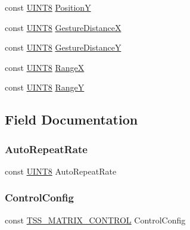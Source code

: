 \begin{DoxyCompactItemize}
\item 
const \hyperlink{_t_s_s___data_types_8h_ab27e9918b538ce9d8ca692479b375b6a}{U\+I\+N\+T8} \hyperlink{struct_t_s_s___c_s_matrix_aac24d6e91ed086564e138c28e7bdb734}{PositionY}
\item 
const \hyperlink{_t_s_s___data_types_8h_ab27e9918b538ce9d8ca692479b375b6a}{U\+I\+N\+T8} \hyperlink{struct_t_s_s___c_s_matrix_af3165ce319b813917cd3b590637f1119}{Gesture\+DistanceX}
\item 
const \hyperlink{_t_s_s___data_types_8h_ab27e9918b538ce9d8ca692479b375b6a}{U\+I\+N\+T8} \hyperlink{struct_t_s_s___c_s_matrix_a1ebd165f70fca973a3fb47a2968e6178}{Gesture\+DistanceY}
\item 
const \hyperlink{_t_s_s___data_types_8h_ab27e9918b538ce9d8ca692479b375b6a}{U\+I\+N\+T8} \hyperlink{struct_t_s_s___c_s_matrix_a93ec03e0fdd72db4648b7b80b6644626}{RangeX}
\item 
const \hyperlink{_t_s_s___data_types_8h_ab27e9918b538ce9d8ca692479b375b6a}{U\+I\+N\+T8} \hyperlink{struct_t_s_s___c_s_matrix_ad2220b46256b31b618d1900e724cb862}{RangeY}
\end{DoxyCompactItemize}


\subsection{Field Documentation}
\mbox{\label{struct_t_s_s___c_s_matrix_aef1117c410a59acb56f45d9674e0dd56}} 
\subsubsection{\texorpdfstring{Auto\+Repeat\+Rate}{AutoRepeatRate}}
{\footnotesize\ttfamily const \hyperlink{_t_s_s___data_types_8h_ab27e9918b538ce9d8ca692479b375b6a}{U\+I\+N\+T8} Auto\+Repeat\+Rate}

\mbox{\label{struct_t_s_s___c_s_matrix_a71bf021551de0ab7006791a812224377}} 
\subsubsection{\texorpdfstring{Control\+Config}{ControlConfig}}
{\footnotesize\ttfamily const \hyperlink{struct_t_s_s___m_a_t_r_i_x___c_o_n_t_r_o_l}{T\+S\+S\+\_\+\+M\+A\+T\+R\+I\+X\+\_\+\+C\+O\+N\+T\+R\+OL} Control\+Config}

